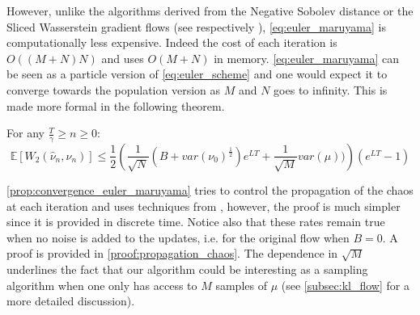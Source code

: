 However, unlike the algorithms derived from the Negative Sobolev distance or the Sliced Wasserstein gradient flows (see respectively \cite{Mroueh:2019,Simsekli:2018}), \cref{eq:euler_maruyama} is computationally less expensive. Indeed the cost of each iteration is $O((M+N)N)$ and uses $O(M+N)$ in memory.
\cref{eq:euler_maruyama} can be seen as a particle version of \cref{eq:euler_scheme} and one would expect it to converge towards the population version as $M$ and $N$ goes to infinity. This is made more formal in the following theorem.
\begin{theorem}\label{prop:convergence_euler_maruyama}
	For any $\frac{T}{\gamma}\geq n\geq 0$:
\[
\mathbb{E}[W_{2}(\hat{\nu}_{n},\nu_{n})]\leq \frac{1}{2}\left(\frac{1}{\sqrt{N}}(B+var(\nu_{0})^{\frac{1}{2}})e^{LT}+\frac{1}{\sqrt{M}}var(\mu))\right)(e^{LT}-1)
\]
\end{theorem}
\cref{prop:convergence_euler_maruyama} tries to control the propagation of the chaos at each iteration and uses techniques from \cite{Jourdain:2007}, however, the proof is much simpler since it is provided in discrete time. Notice also that these rates remain true when no noise is added to the updates, i.e. for the original flow when $B=0$. A proof is provided in \cref{proof:propagation_chaos}. The dependence in $\sqrt{M}$ underlines the fact that our algorithm could be interesting as a sampling algorithm when one only has access to $M$ samples of $\mu$ (see \cref{subsec:kl_flow} for a more detailed discussion).

